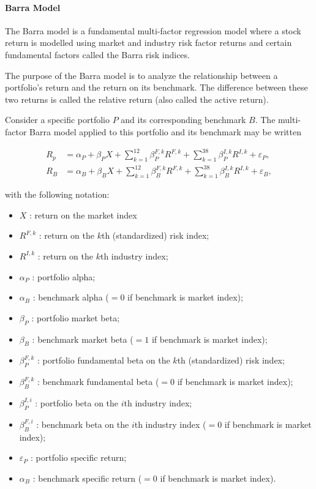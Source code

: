 \paragraph{Barra Model} The Barra model is a fundamental multi-factor regression model where a stock return is modelled using market and industry risk factor returns and certain fundamental factors called the Barra risk indices. 

The purpose of the Barra model is to analyze the relationship between a portfolio's return and the return on its benchmark. The difference between these two returns is called the relative return (also called the active return). 

Consider a specific portfolio $P$ and its corresponding benchmark $B$. The multi-factor Barra
model applied to this portfolio and its benchmark may be written

\begin{align*}
R_p &= \alpha_P + \beta_P X + \sum_{k=1}^{12} \beta_P^{F,k} R^{F,k} + \sum_{k=1}^{38} \beta_P^{I,k} R^{I,k} + \varepsilon_P,
\\
R_B &= \alpha_B + \beta_B X + \sum_{k=1}^{12} \beta_B^{F,k} R^{F,k} + \sum_{k=1}^{38} \beta_B^{I,k} R^{I,k} + \varepsilon_B,
\end{align*}

with the following notation:

\begin{itemize}[leftmargin=*,noitemsep]
  \item $X$ : return on the market index
  \item $R^{F,k}$ : return on the $k$th (standardized) risk index;
  \item $R^{I,k}$ : return on the $k$th industry index;
  \item $\alpha_P$ : portfolio alpha;
  \item $\alpha_B$ : benchmark alpha ($= 0$ if benchmark is market index);
  \item $\beta_P$ : portfolio market beta;
  \item $\beta_B$ : benchmark market beta ($= 1$ if benchmark is market index);
  \item $\beta_P^{F,k}$ : portfolio fundamental beta on the $k$th (standardized) risk index;
  \item $\beta_B^{F,k}$ : benchmark fundamental beta ($= 0$ if benchmark is market index);
  \item $\beta_P^{I,i}$ : portfolio beta on the $i$th industry index;
  \item $\beta_B^{F,i}$ : benchmark beta on the $i$th industry index ($= 0$ if benchmark is market index);
  \item $\varepsilon_P$ : portfolio specific return;
  \item $\alpha_B$ : benchmark specific return ($= 0$ if benchmark is market index).
\end{itemize}
